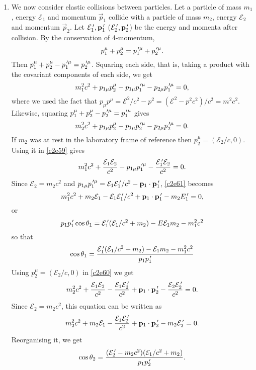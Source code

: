\begin{enumerate}
\item We now consider elastic collisions between particles. Let a particle of
mass $m_1$, energy $\mathcal{E}_1$ and momentum $\vec{p}_1$ collide with a particle of mass
$m_2$, energy $\mathcal{E}_2$ and momentum $\vec{p}_2$. Let $\mathcal{E}_1^{\,\prime}, 
\mathbf{p}_1^{\,\prime}$ ($\mathcal{E}_2^{\,\prime}, \mathbf{p}_2^{\,\prime}$) be the energy and momenta after 
collision. By the conservation of 4-momentum,
\begin{equation}\label{c2e58}
p_1^\mu + p_2^\mu = p_1^{{\,\prime}\mu} + p_2^{{\,\prime}\mu}.
\end{equation}
Then $p_1^\mu + p_2^\mu - p_1^{{\,\prime}\mu} = p_2^{{\,\prime}\mu}$. Squaring each side, that
is, taking a product with the covariant components of each side, we get
\begin{equation}\label{c2e59}
m_1^2c^2 + p_{1\mu}p_2^\mu - p_{1\mu}p_1^{{\,\prime}\mu} - p_{2\mu}p_1^{{\,\prime}\mu} = 0,
\end{equation}
where we used the fact that $p_\mu p^\mu = \mathcal{E}^2/c^2 - p^2 = 
(\mathcal{E}^2 - p^2c^2)/c^2 = m^2c^2$.
Likewise, squaring $p_1^\mu + p_2^\mu - p_2^{{\,\prime}\mu} = p_1^{{\,\prime}\mu}$ gives
\begin{equation}\label{c2e60}
m_2^2c^2 + p_{1\mu}p_2^\mu - p_{1\mu}p_2^{{\,\prime}\mu} - p_{2\mu}p_2^{{\,\prime}\mu} = 0.
\end{equation}
If $m_2$ was at rest in the laboratory frame of reference then $p_2^\mu = (\mathcal{E}_2/c,
0)$. Using it in \eqref{c2e59} gives
\begin{equation}\label{c2e61}
m_1^2c^2 + \frac{\mathcal{E}_1\mathcal{E}_2}{c^2} - p_{1\mu}p_1^{{\,\prime}\mu} 
- \frac{\mathcal{E}_1^{\,\prime} \mathcal{E}_2}{c^2} = 0.
\end{equation}
Since $\mathcal{E}_2 = m_2c^2$ and $p_{1\mu}p_1^{{\,\prime}\mu} = 
\mathcal{E}_1\mathcal{E}_1^{\,\prime}/c^2 - \mathbf{p}_1\cdot\mathbf{p}_1^{\,\prime}$, \eqref{c2e61} becomes
\begin{equation}\label{c2e62}
m_1^2c^2 + m_2\mathcal{E}_1 - \mathcal{E}_1\mathcal{E}_1^{\,\prime}/c^2 + 
\mathbf{p}_1\cdot\mathbf{p}_1^{\,\prime} - m_2E_1^{\,\prime} = 0,
\end{equation}
or
\[
p_1p_1^{\,\prime}\cos\theta_1 = \mathcal{E}_1^{\,\prime}(\mathcal{E}_1/c^2 + m_2) - E\mathcal{E}_1m_2 - m_1^2c^2
\]
so that
\begin{equation}\label{c2e63}
\cos\theta_1 = \frac{\mathcal{E}_1^{\,\prime}(\mathcal{E}_1/c^2 + m_2) - \mathcal{E}_1m_2 - m_1^2c^2}{p_1p_1^{\,\prime}}
\end{equation}
Using $p_2^\mu = (\mathcal{E}_2/c, 0)$ in \eqref{c2e60} we get
\[
m_2^2c^2 + \frac{\mathcal{E}_1\mathcal{E}_2}{c^2} - \frac{\mathcal{E}_1\mathcal{E}_2^{\,\prime}}{c^2} + 
\mathbf{p}_1\cdot\mathbf{p}_2^{\,\prime} - \frac{\mathcal{E}_2\mathcal{E}_2^{\,\prime}}{c^2} = 0.
\]
Since $\mathcal{E}_2 = m_2c^2$, this equation can be written as
\[
m_2^2c^2 + m_2\mathcal{E}_1 - \frac{\mathcal{E}_1\mathcal{E}_2^{\,\prime}}{c^2} + 
\mathbf{p}_1\cdot\mathbf{p}_2^{\,\prime} - m_2\mathcal{E}_2^{\,\prime} = 0.
\]
Reorganising it, we get
\begin{equation}\label{c2e64}
\cos\theta_2 = \frac{(\mathcal{E}_2^{\,\prime} - m_2c^2)(\mathcal{E}_1/c^2 + m_2)}{p_1p_2^{\,\prime}}.
\end{equation}


\end{enumerate}
